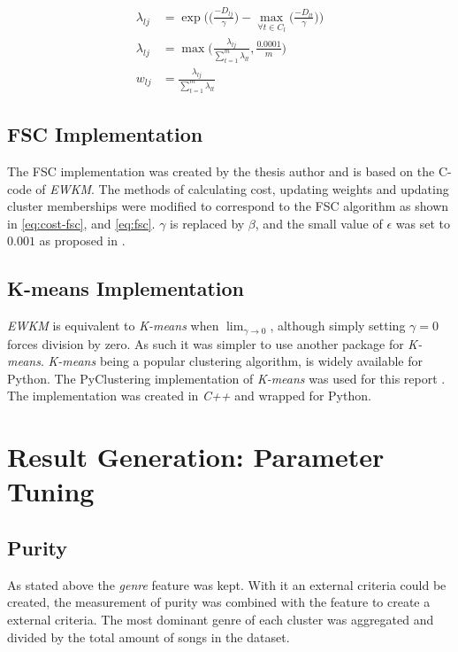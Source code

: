 \documentclass[../report.tex]{subfiles}
\begin{document}
\begin{align}
  \lambda_{lj} &= \exp\bigg({\Big(\frac{-D_{lj}}{\gamma}\Big) - \max_{\forall{t} \in C_l}\Big({\frac{-D_{lt}}{\gamma}}\Big)}\bigg) \\
  \lambda_{lj} &= \max\bigg(\frac{\lambda_{lj}}{\sum_{t=1}^{m}{\lambda_{lt}}}, \frac{0.0001}{m}\bigg)\\
  \label{eq:newlambda}
  w_{lj} &= \frac{\lambda_{lj}}{\sum^{m}_{t=1}{\lambda_{ lt }}}
\end{align}

\subsection{FSC Implementation}
The FSC implementation was created by the thesis author and is based on the C-code of \textit{EWKM}. The methods of calculating cost, updating weights and updating cluster memberships were modified to correspond to the FSC algorithm as shown in \ref{eq:cost-fsc}, and \ref{eq:fsc}. $\gamma$ is replaced by $\beta$, and the small value of $\epsilon$ was set to $0.001$ as proposed in \cite{Gan2006}.

\subsection{K-means Implementation}
\textit{EWKM} is equivalent to \textit{K-means} when $\lim_{\gamma \to 0}$, although simply setting $\gamma = 0$ forces division by zero. As such it was simpler to use another package for \textit{K-means}. \textit{K-means} being a popular clustering algorithm, is widely available for Python. The PyClustering implementation of \textit{K-means} was used for this report \cite{Novikov2019}. The implementation was created in \textit{C++} and wrapped for Python.

\section{Result Generation: Parameter Tuning}


\subsection{Purity}

As stated above the \textit{genre} feature was kept. With it an external criteria could be created, the measurement of purity was combined with the feature to create a external criteria. The most dominant genre of each cluster was aggregated and divided by the total amount of songs in the dataset.
\end{document}

